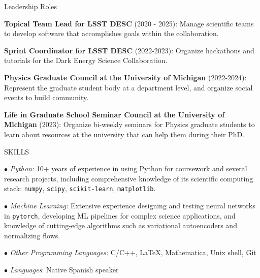 \documentclass{resume} %
\newcommand{\pytorch}[0]{\texttt{pytorch}}
\begin{document}
\begin{rSection}{Leadership Roles} \itemsep -3pt \vspace*{-.25cm}

\item{\textbf{Topical Team Lead for LSST DESC} (2020 - 2025): Manage scientific teams to develop software that accomplishes goals within the collaboration.}

\item{\textbf{Sprint Coordinator for LSST DESC} (2022-2023): Organize hackathons and tutorials for the Dark Energy Science Collaboration.}

\item{\textbf{Physics Graduate Council at the University of Michigan} (2022-2024): Represent the graduate student body at a department level, and organize social events to build community.}

\item{\textbf{Life in Graduate School Seminar Council at the University of Michigan} (2023): Organize bi-weekly seminars for Physics graduate students to learn about resources at the university that can help them during their PhD.}
\end{rSection}


\begin{rSection}{SKILLS}
\vspace*{-0.3cm}
\item {\small $\bullet$} \textit{Python:} 10+ years of experience in using Python for coursework and several research projects, including comprehensive knowledge of its scientific computing stack: \texttt{numpy}, \texttt{scipy}, \texttt{scikit-learn},
\texttt{matplotlib}.

\item {\small $\bullet$} \textit{Machine Learning:} Extensive experience designing and testing neural networks in \pytorch, developing ML pipelines for complex science applications, and knowledge of cutting-edge algorithms such as variational autoencoders and normalizing flows.

\item {\small $\bullet$} \textit{Other Programming Languages:} C/C++, \LaTeX, Mathematica, Unix shell, Git   

\item {\small $\bullet$} \textit{Languages}: Native Spanish speaker
\end{rSection}
\end{document}
